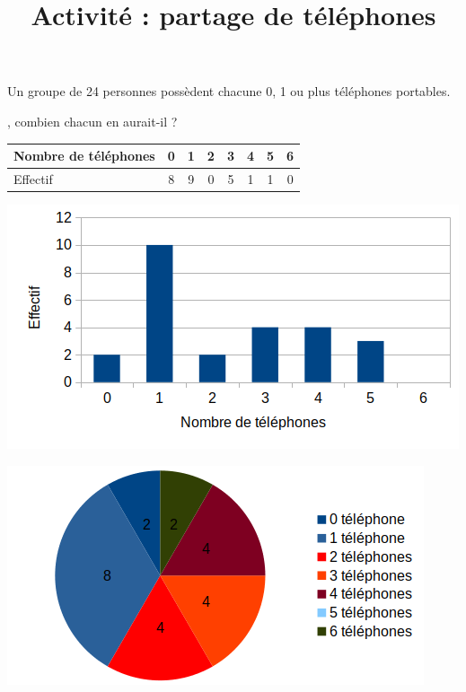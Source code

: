 \documentclass{beamer}
\title{Activité : partage de téléphones}
\author{}
\date{}
\begin{document}
\begin{frame}
	\maketitle
\end{frame}

\begin{frame}
	Un groupe de 24 personnes possèdent chacune 0, 1 ou plus téléphones portables. \vspace{1em}

	, combien chacun en aurait-il ?
\end{frame}

\begin{frame}
	\begin{center}
		\begin{tabular}{|l|c|c|c|c|c|c|c|}
			\hline
			Nombre de téléphones & 0 & 1 & 2 & 3 & 4 & 5 & 6
			\\ \hline
			Effectif             & 8 & 9 & 0 & 5 & 1 & 1 & 0
			\\ \hline
		\end{tabular}
	\end{center}
\end{frame}

\begin{frame}
	\begin{center}
		\includegraphics[width=\textwidth]{Images/Diagramme en barres.png}
	\end{center}
\end{frame}

\begin{frame}
	\begin{center}
		\includegraphics[width=\textwidth]{Images/Diagramme circulaire.png}
	\end{center}
\end{frame}
\end{document}
